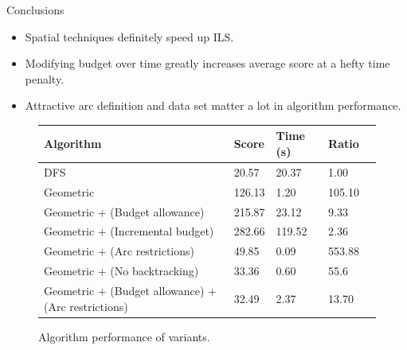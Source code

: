 \documentclass{beamer}
\begin{document}

\begin{frame}{Conclusions}
    \begin{itemize}
        \item Spatial techniques definitely speed up ILS.
        \item Modifying budget over time greatly increases average score at a hefty time penalty.
        \item Attractive arc definition and data set matter a lot in algorithm performance.
    \end{itemize}
    
    \begin{center}
    \begin{figure}
    \begin{tabular}{|p{15em}|l|l|l|l|}
    \hline
    \textbf{Algorithm} & \textbf{Score} & \textbf{Time (s)} & \textbf{Ratio} \\
    \hline
    DFS & 20.57 & 20.37 & 1.00 \\
    \hline
    Geometric & 126.13 & 1.20 & 105.10 \\
    \hline
    Geometric + (Budget allowance) & 215.87 & 23.12 & 9.33 \\
    \hline
    Geometric + (Incremental budget) & 282.66 & 119.52 & 2.36 \\
    \hline
    Geometric + (Arc restrictions) & 49.85 & 0.09 & 553.88 \\
    \hline
    Geometric + (No backtracking) & 33.36 & 0.60 & 55.6 \\
    \hline
    Geometric + (Budget allowance) + (Arc restrictions) & 32.49 & 2.37 & 13.70 \\
    \hline
    \end{tabular}
    \caption{Algorithm performance of variants.}
    \end{figure}
    \end{center}
\end{frame}
\end{document}
